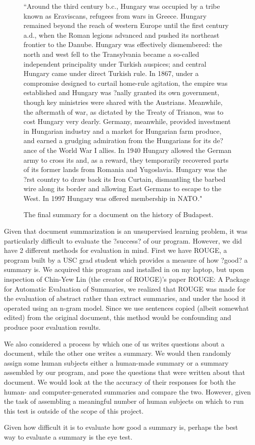 \documentclass[12pt]{article}
\theoremstyle{plain}
\theoremstyle{definition}
\theoremstyle{remark}
\theoremstyle{plain}
\begin{document}
\begin{figure}
	
``Around the third century b.c., Hungary was occupied by a tribe known as Eraviscans, refugees from wars in Greece. Hungary remained beyond the reach of western Europe until the first century a.d., when the Roman legions advanced and pushed its northeast frontier to the Danube. Hungary was effectively dismembered: the north and west fell to the Transylvania became a so-called independent principality under Turkish auspices; and central Hungary came under direct Turkish rule. In 1867, under a compromise designed to curtail home-rule agitation, the empire was established and Hungary was ?nally granted its own government, though key ministries were shared with the Austrians. Meanwhile, the aftermath of war, as dictated by the Treaty of Trianon, was to cost Hungary very dearly. Germany, meanwhile, provided investment in Hungarian industry and a market for Hungarian farm produce, and earned a grudging admiration from the Hungarians for its de?ance of the World War I allies. In 1940 Hungary allowed the German army to cross its and, as a reward, they temporarily recovered parts of its former lands from Romania and Yugoslavia. Hungary was the ?rst country to draw back its Iron Curtain, dismantling the barbed wire along its border and allowing East Germans to escape to the West. In 1997 Hungary was offered membership in NATO."
\caption{The final summary for a document on the history of Budapest.}\label{goodsummary}
\end{figure}


 


	Given that document summarization is an unsupervised learning problem, it was particularly difficult to evaluate the ?success? of our program. However, we did have 2 different methods for evaluation in mind. First we have ROUGE, a program built by a USC grad student which provides a measure of how ?good? a summary is. We acquired this program and installed in on my laptop, but upon inspection of Chin-Yew Lin (the creator of ROUGE)'s paper ROUGE: A Package for Automatic Evaluation of Summaries, we realized that ROUGE was made for the evaluation of abstract rather than extract summaries, and under the hood it operated using an n-gram model. Since we use sentences copied (albeit somewhat edited) from the original document, this method would be confounding and produce poor evaluation results.
	
We also considered a process by which one of us writes questions about a document, while the other one writes a summary. We would then randomly assign some human subjects either a human-made summary or a summary assembled by our program, and pose the questions that were written about that document. We would look at the the accuracy of their responses for both the human- and computer-generated summaries and compare the two. However, given the task of assembling a meaningful number of human subjects on which to run this test is outside of the scope of this project.

Given how difficult it is to evaluate how good a summary is, perhaps the best way to evaluate a summary is the eye test.
\end{document}
